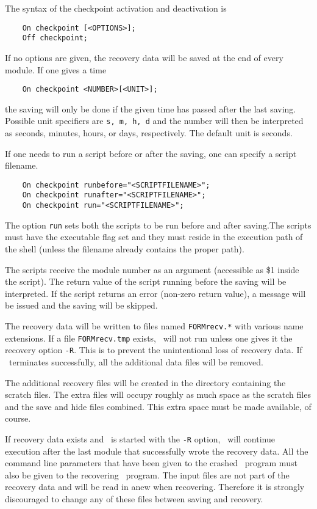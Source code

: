 The syntax of the checkpoint activation and deactivation is
\begin{verbatim}
    On checkpoint [<OPTIONS>];
    Off checkpoint;
\end{verbatim}

If no options are given, the recovery data will be saved at the end of every
module. If one gives a time
\begin{verbatim}
    On checkpoint <NUMBER>[<UNIT>];
\end{verbatim}
the saving will only be done if the given time has passed after the last 
saving. Possible unit specifiers are {\tt s, m, h, d} and the number will 
then be interpreted as seconds, minutes, hours, or days, respectively. The 
default unit is seconds.

If one needs to run a script before or after the saving,
one can specify a script filename.
\begin{verbatim}
    On checkpoint runbefore="<SCRIPTFILENAME>";
    On checkpoint runafter="<SCRIPTFILENAME>";
    On checkpoint run="<SCRIPTFILENAME>";
\end{verbatim}
The option {\tt run} sets both the scripts to be run before and 
after saving.The scripts must have the executable flag set and they must 
reside in the execution path of the shell (unless the filename 
already contains the proper path).

The scripts receive the module number as an argument 
(accessible as \$1 inside the script). The return value of the script 
running before the saving will be interpreted. If the script returns an 
error (non-zero return value), a message will be issued and the saving will 
be skipped. 

The recovery data will be written to files named {\tt FORMrecv.*} with 
various name extensions. If a file {\tt FORMrecv.tmp} exists, \FORM\ will not 
run unless one gives it the recovery option
{\tt -R}. This is to prevent the unintentional loss of recovery data. If 
\FORM\ terminates successfully, all the additional data files will be removed.

The additional recovery files will be created in the directory containing 
the scratch files.  The extra files will occupy roughly as much space as 
the scratch files and the save and 
hide files combined. This extra space must be made 
available, of course.

If recovery data exists and \FORM\ is started with the {\tt -R} option, \FORM\ 
will continue execution after the last module that successfully wrote the 
recovery data. All the command line parameters that have been given to the 
crashed \FORM\ program\index{crashed \FORM\ program} must also be given to the 
recovering \FORM\ program. The input files are not part of the recovery data 
and will be read in anew when recovering. Therefore it is strongly 
discouraged to change any of these files between saving and recovery.

